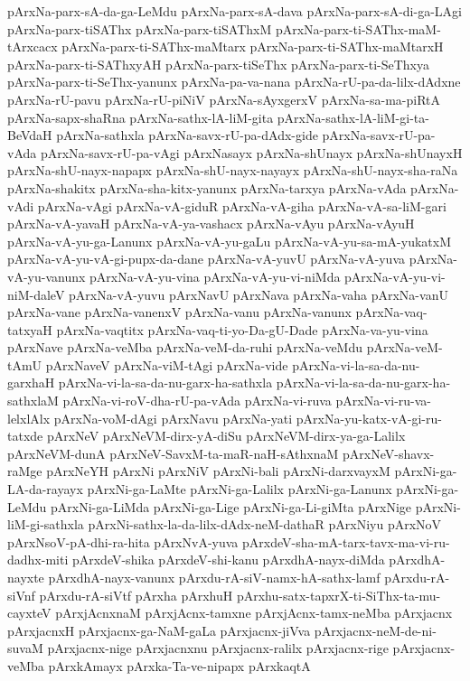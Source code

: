 {pArxNa-parx-sA-da-ga-LeMdu
pArxNa-parx-sA-dava
pArxNa-parx-sA-di-ga-LAgi
pArxNa-parx-tiSAThx
pArxNa-parx-tiSAThxM
pArxNa-parx-ti-SAThx-maM-tArxcacx
pArxNa-parx-ti-SAThx-maMtarx
pArxNa-parx-ti-SAThx-maMtarxH
pArxNa-parx-ti-SAThxyAH
pArxNa-parx-tiSeThx
pArxNa-parx-ti-SeThxya
pArxNa-parx-ti-SeThx-yanunx
pArxNa-pa-va-nana
pArxNa-rU-pa-da-lilx-dAdxne
pArxNa-rU-pavu
pArxNa-rU-piNiV
pArxNa-sAyxgerxV
pArxNa-sa-ma-piRtA
pArxNa-sapx-shaRna
pArxNa-sathx-lA-liM-gita
pArxNa-sathx-lA-liM-gi-ta-BeVdaH
pArxNa-sathxla
pArxNa-savx-rU-pa-dAdx-gide
pArxNa-savx-rU-pa-vAda
pArxNa-savx-rU-pa-vAgi
pArxNasayx
pArxNa-shUnayx
pArxNa-shUnayxH
pArxNa-shU-nayx-napapx
pArxNa-shU-nayx-nayayx
pArxNa-shU-nayx-sha-raNa
pArxNa-shakitx
pArxNa-sha-kitx-yanunx
pArxNa-tarxya
pArxNa-vAda
pArxNa-vAdi
pArxNa-vAgi
pArxNa-vA-giduR
pArxNa-vA-giha
pArxNa-vA-sa-liM-gari
pArxNa-vA-yavaH
pArxNa-vA-ya-vashacx
pArxNa-vAyu
pArxNa-vAyuH
pArxNa-vA-yu-ga-Lanunx
pArxNa-vA-yu-gaLu
pArxNa-vA-yu-sa-mA-yukatxM
pArxNa-vA-yu-vA-gi-pupx-da-dane
pArxNa-vA-yuvU
pArxNa-vA-yuva
pArxNa-vA-yu-vanunx
pArxNa-vA-yu-vina
pArxNa-vA-yu-vi-niMda
pArxNa-vA-yu-vi-niM-daleV
pArxNa-vA-yuvu
pArxNavU
pArxNava
pArxNa-vaha
pArxNa-vanU
pArxNa-vane
pArxNa-vanenxV
pArxNa-vanu
pArxNa-vanunx
pArxNa-vaq-tatxyaH
pArxNa-vaqtitx
pArxNa-vaq-ti-yo-Da-gU-Dade
pArxNa-va-yu-vina
pArxNave
pArxNa-veMba
pArxNa-veM-da-ruhi
pArxNa-veMdu
pArxNa-veM-tAmU
pArxNaveV
pArxNa-viM-tAgi
pArxNa-vide
pArxNa-vi-la-sa-da-nu-garxhaH
pArxNa-vi-la-sa-da-nu-garx-ha-sathxla
pArxNa-vi-la-sa-da-nu-garx-ha-sathxlaM
pArxNa-vi-roV-dha-rU-pa-vAda
pArxNa-vi-ruva
pArxNa-vi-ru-va-lelxlAlx
pArxNa-voM-dAgi
pArxNavu
pArxNa-yati
pArxNa-yu-katx-vA-gi-ru-tatxde
pArxNeV
pArxNeVM-dirx-yA-diSu
pArxNeVM-dirx-ya-ga-Lalilx
pArxNeVM-dunA
pArxNeV-SavxM-ta-maR-naH-sAthxnaM
pArxNeV-shavx-raMge
pArxNeYH
pArxNi
pArxNiV
pArxNi-bali
pArxNi-darxvayxM
pArxNi-ga-LA-da-rayayx
pArxNi-ga-LaMte
pArxNi-ga-Lalilx
pArxNi-ga-Lanunx
pArxNi-ga-LeMdu
pArxNi-ga-LiMda
pArxNi-ga-Lige
pArxNi-ga-Li-giMta
pArxNige
pArxNi-liM-gi-sathxla
pArxNi-sathx-la-da-lilx-dAdx-neM-dathaR
pArxNiyu
pArxNoV
pArxNsoV-pA-dhi-ra-hita
pArxNvA-yuva
pArxdeV-sha-mA-tarx-tavx-ma-vi-ru-dadhx-miti
pArxdeV-shika
pArxdeV-shi-kanu
pArxdhA-nayx-diMda
pArxdhA-nayxte
pArxdhA-nayx-vanunx
pArxdu-rA-siV-namx-hA-sathx-lamf
pArxdu-rA-siVnf
pArxdu-rA-siVtf
pArxha
pArxhuH
pArxhu-satx-tapxrX-ti-SiThx-ta-mu-cayxteV
pArxjAcnxnaM
pArxjAcnx-tamxne
pArxjAcnx-tamx-neMba
pArxjacnx
pArxjacnxH
pArxjacnx-ga-NaM-gaLa
pArxjacnx-jiVva
pArxjacnx-neM-de-ni-suvaM
pArxjacnx-nige
pArxjacnxnu
pArxjacnx-ralilx
pArxjacnx-rige
pArxjacnx-veMba
pArxkAmayx
pArxka-Ta-ve-nipapx
pArxkaqtA
}
